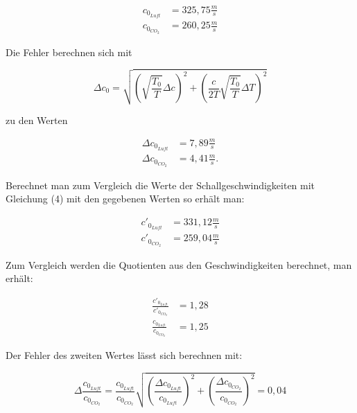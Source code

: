 \documentclass{article}
\begin{document}
\begin{equation}
    \begin{split}
        c_{0_{Luft}} &= 325,75 \frac{m}{s} \\
        c_{0_{CO_2}} &= 260,25 \frac{m}{s}
    \end{split}
\end{equation}

Die Fehler berechnen sich mit

\begin{equation}
    \Delta c_0 = \sqrt{\left( \sqrt{\frac{T_0}{T}} \Delta c \right)^2 + \left(\frac{c}{2T} \sqrt{\frac{T_0}{T}} \Delta T \right)^2}
\end{equation}

zu den Werten

\begin{equation}
    \begin{split}
        \Delta c_{0_{Luft}} &= 7,89 \frac{m}{s} \\
        \Delta c_{0_{CO_2}} &= 4,41 \frac{m}{s} .
    \end{split}
\end{equation}

Berechnet man zum Vergleich die Werte der Schallgeschwindigkeiten mit Gleichung (4) mit den gegebenen Werten so erhält man:

\begin{equation}
    \begin{split}
        c'_{0_{Luft}} &= 331,12 \frac{m}{s} \\
        c'_{0_{CO_2}} &= 259,04 \frac{m}{s}
    \end{split}
\end{equation}

Zum Vergleich werden die Quotienten aus den Geschwindigkeiten berechnet, man erhält:

\begin{equation}
    \begin{split}
        \frac{c'_{0_{Luft}}}{c'_{0_{CO_2}}} &= 1,28 \\
        \frac{c_{0_{Luft}}}{c_{0_{CO_2}}} &= 1,25
    \end{split}
\end{equation}

Der Fehler des zweiten Wertes lässt sich berechnen mit:

\begin{equation}
    \Delta \frac{c_{0_{Luft}}}{c_{0_{CO_2}}} = \frac{c_{0_{Luft}}}{c_{0_{CO_2}}} \sqrt{\left( \frac{\Delta c_{0_{Luft}}}{c_{0_{Luft}}} \right)^2 + \left( \frac{\Delta c_{0_{CO_2}}}{c_{0_{CO_2}}} \right)^2} = 0,04
\end{equation}
\end{document}
